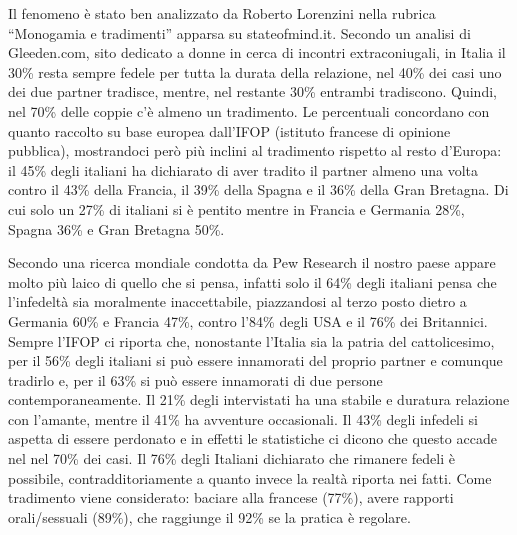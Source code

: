 \documentclass[12pt]{book} %
\begin{document}
Il fenomeno è stato ben analizzato da Roberto Lorenzini nella rubrica “Monogamia e tradimenti” apparsa su
stateofmind.it. Secondo un analisi di
Gleeden.com, sito dedicato a donne in cerca di incontri extraconiugali, in Italia il 30\% resta sempre fedele per tutta
la durata della relazione, nel 40\% dei casi uno dei due partner tradisce, mentre, nel restante 30\% entrambi
tradiscono. Quindi, nel 70\% delle coppie c'è almeno un tradimento. Le percentuali concordano con
quanto raccolto su base europea dall'IFOP (istituto francese di opinione pubblica), mostrandoci
però più inclini al tradimento rispetto al resto d'Europa: il 45\% degli italiani ha dichiarato di
aver tradito il partner almeno una volta contro il 43\% della Francia, il 39\% della Spagna e il 36\% della Gran
Bretagna. Di cui solo un 27\% di italiani si è pentito mentre in Francia e Germania 28\%, Spagna 36\% e Gran Bretagna
50\%. 

Secondo una ricerca mondiale condotta da Pew
Research il nostro paese appare molto più laico di quello che si pensa, infatti solo il 64\% degli italiani pensa che
l'infedeltà sia moralmente inaccettabile, piazzandosi al terzo posto dietro a Germania 60\% e
Francia 47\%, contro l'84\% degli USA e il 76\% dei Britannici. Sempre l'IFOP
ci riporta che, nonostante l'Italia sia la patria del cattolicesimo, per il 56\% degli italiani si
può essere innamorati del proprio partner e comunque tradirlo e, per il 63\% si può essere innamorati di due persone
contemporaneamente. Il 21\% degli intervistati ha una stabile e duratura relazione con l'amante,
mentre il 41\% ha avventure occasionali. Il 43\% degli infedeli si aspetta di essere perdonato e in effetti le
statistiche ci dicono che questo accade nel nel 70\% dei casi. Il 76\% degli Italiani dichiarato che rimanere fedeli è
possibile, contradditoriamente a quanto invece la realtà riporta nei fatti. Come tradimento viene considerato: baciare
alla francese (77\%), avere rapporti orali/sessuali (89\%), che raggiunge il 92\% se la pratica è regolare. 
\newline
\newline
\end{document}
